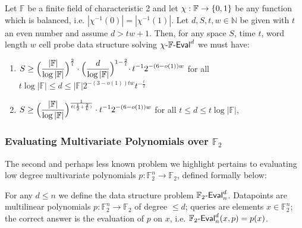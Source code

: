 \begin{theorem}\label{cellprobe:thm:polynom-lb}
Let $\mathbb{F}$ be a finite field of characteristic 2 and let $\chi: \mathbb{F} \to \{0,1\}$ be any function which is balanced, i.e. $|\chi^{-1}(0)| = |\chi^{-1}(1)|$. Let $d,S,t,w \in \mathbb{N}$ be given with $t$ an even number and assume $d > tw + 1$. Then, for any space $S$, time $t$, word length $w$ cell probe data structure solving $\chi\text{-}\mathbb{F}\text{-}\mathsf{Eval}^d$ we must have:
\begin{enumerate}
    \item $\begin{aligned}[t]
    S \geq  \Bigl( \frac{|\mathbb{F}|}{\log |\mathbb{F}|}\Bigr)^{\frac{2}{t}} \cdot \Bigl(\frac{d}{\log |\mathbb{F}|}\Bigl)^{1 - \frac{2}{t}}  \cdot\,t^{-1}2^{-(6-o(1))w }
  \end{aligned}$ for all $t\log |\mathbb{F}| \leq d \leq |\mathbb{F}|2^{-(3-o(1))tw} t^{-\frac{t}{2}}$
  \item $\begin{aligned}[t]
    S \geq   \Bigl(\frac{|\mathbb{F}|}{\log |\mathbb{F}|}\Bigr)^{\frac{1}{t(\frac{1}{2} + \frac{2}{k})}} \cdot t^{-1}2^{-(6-o(1))w}
  \end{aligned}$ for all $t \leq d \leq t\log |\mathbb{F}|$,
\end{enumerate}
\end{theorem}

\subsubsection{Evaluating Multivariate Polynomials over $\mathbb{F}_2$}
The second and perhaps less known problem we highlight pertains to evaluating low degree multivariate polynomials $p: \mathbb{F}_2^n \to \mathbb{F}_2$, defined formally below:
\begin{definition}
For any $d\leq n$ we define the data structure problem $\mathbb{F}_2\text{-}\mathsf{Eval}_n^d$. Datapoints are multilinear polynomials $p: \mathbb{F}_2^n \to \mathbb{F}_2$ of degree $\leq d$; queries are elements $x \in \mathbb{F}_2^n$; the correct answer is the evaluation of $p$ on $x$, i.e. $\mathbb{F}_2\text{-}\mathsf{Eval}_n^d(x,p) = p(x)$.
\end{definition}

